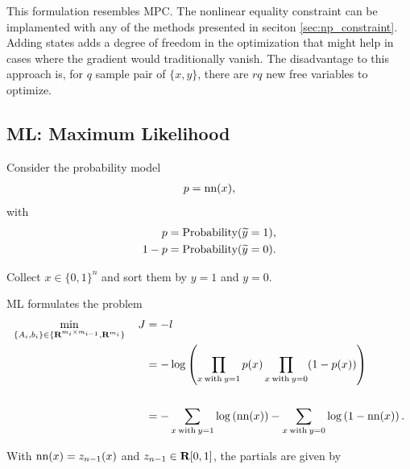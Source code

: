 \documentclass{article}
\begin{document}
    This formulation resembles MPC.  
    The nonlinear equality constraint can be implamented 
    with any of the methods presented in seciton \ref{sec:np_constraint}.
    Adding states adds a degree of freedom in the optimization 
    that might help in cases where the gradient would traditionally vanish.
    The disadvantage to this approach is, 
    for $q$ sample pair of $\{x,y\}$, there are $rq$ new free variables to optimize.

    \clearpage
\subsection{ML: Maximum Likelihood}

    Consider the probability model
    \begin{align*}
        p=\text{nn}(x),
    \end{align*}
    with 
    \begin{align*}
        p&=\text{Probability}(\widetilde{y}=1),\\
        1-p&=\text{Probability}(\widetilde{y}=0).
    \end{align*}
    
    Collect $x\in\{0,1\}^n$ and sort them by $y=1$ and $y=0$.

    ML formulates the problem
    \begin{align*}
        \min_{\{A_i,b_i\}\in\{\textbf{R}^{m_i\times m_{i-1}},\textbf{R}^{m_i}\}}\quad J &= -l\\
        &=-\log\left(\prod_{x\:\text{with}\:y=1}p(x)
            \prod_{x\:\text{with}\:y=0}(1-p(x))\right)\\\\
        &=-\sum_{x\:\text{with}\:y=1}\log \left(\text{nn}(x)\right)
        -\sum_{x\:\text{with}\:y=0} \log\left(1-\text{nn}(x)\right).
    \end{align*}

    With $\text{nn}(x)=z_{n-1}(x)$ and $z_{n-1}\in\textbf{R}[0,1]$, the partials are given by
\end{document}
